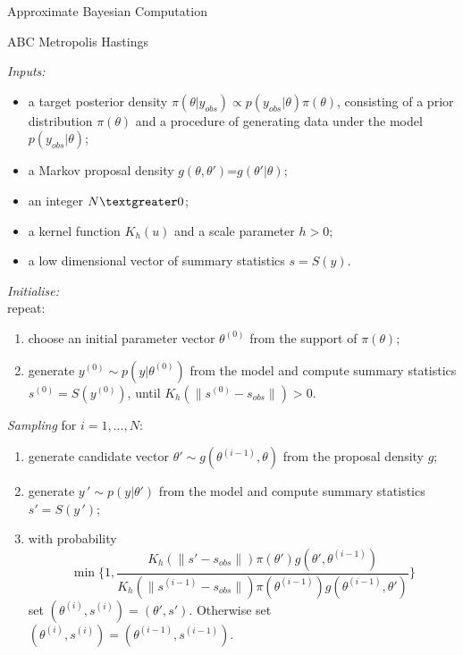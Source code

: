 \documentclass{beamer}
\begin{document}
\begin{section}{Approximate Bayesian Computation}
	
	\begin{frame}[plain]{}
		\sectionpage
	\end{frame}
	
\begin{frame}{ABC Metropolis Hastings}
	\only<1> {
		\emph{Inputs:}
		\begin{itemize}
			\item a target posterior density $\pi(\theta | y_{obs}) \propto p(y_{obs}|\theta) \pi(\theta)$, consisting of a prior distribution $\pi(\theta)$ and a procedure of generating data under the model $p(y_{obs}|\theta)$;
			\item a Markov proposal density $g(\theta,\theta')$=$g(\theta' | \theta)$;
			\item an integer $N \textgreater0$;
			\item a kernel function $K_h(u)$ and a scale parameter $h > 0$;
			\item a low dimensional vector of summary statistics $s=S(y)$.
		\end{itemize}
		
		\emph{Initialise:} \\
		repeat:
		\begin{enumerate}
			\item choose an initial parameter vector $\theta^{(0)}$ from the support of $\pi(\theta)$;
			\item generate $ y^{(0)} \sim p(y|\theta ^ {(0)})$ from the model and compute summary statistics $s^{(0)}=S(y^{(0)})$, until ${K_h(\parallel s^{(0)}-s_{obs}\parallel)} >0$.
		\end{enumerate}
	}
	 {
		\emph{Sampling} for $i=1,...,N$:
		\begin{enumerate}
			\item generate candidate vector $\theta' \sim g(\theta^{(i-1)},\theta)$ from the proposal density $g$;
			\item generate $ y\,' \sim p(y|\theta')$ from the model and compute summary statistics  $s' = S(y\,')$;
			\item with probability $$\min \{ 1, \frac{K_h(\parallel s'-s_{obs}\parallel)   \pi(\theta')g(\theta',\theta^{(i-1)})}{K_h(\parallel s^{(i-1)}-s_{obs}\parallel)   \pi(\theta^{(i-1)})g(\theta^{(i-1)},\theta') } \}$$ 
			set $(\theta^{(i)},s^{(i)})=(	\theta',s')$. 
			Otherwise set  $(\theta^{(i)},s^{(i)})=(\theta^{(i-1)},s^{(i-1)})$.
		\end{enumerate}
		
}
\end{frame}
\end{section}
\end{document}
